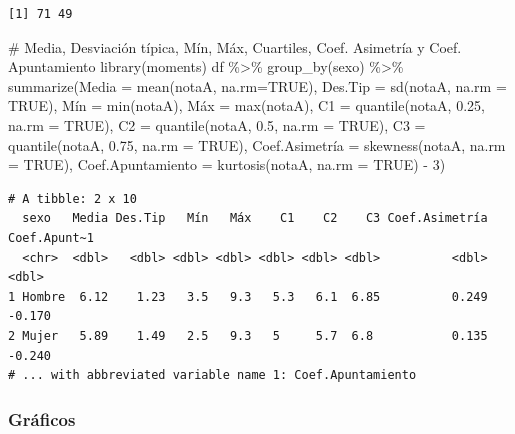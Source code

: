 \documentclass[
  a4paper,
]{scrreport}
\newenvironment{Shaded}{\begin{snugshade}}{\end{snugshade}}
\newcommand{\AttributeTok}[1]{\textcolor[rgb]{0.40,0.45,0.13}{#1}}
\newcommand{\CommentTok}[1]{\textcolor[rgb]{0.37,0.37,0.37}{#1}}
\newcommand{\ConstantTok}[1]{\textcolor[rgb]{0.56,0.35,0.01}{#1}}
\newcommand{\DecValTok}[1]{\textcolor[rgb]{0.68,0.00,0.00}{#1}}
\newcommand{\FloatTok}[1]{\textcolor[rgb]{0.68,0.00,0.00}{#1}}
\newcommand{\FunctionTok}[1]{\textcolor[rgb]{0.28,0.35,0.67}{#1}}
\newcommand{\NormalTok}[1]{\textcolor[rgb]{0.00,0.23,0.31}{#1}}
\newcommand{\OtherTok}[1]{\textcolor[rgb]{0.00,0.23,0.31}{#1}}
\newcommand{\SpecialCharTok}[1]{\textcolor[rgb]{0.37,0.37,0.37}{#1}}
\theoremstyle{definition}
\theoremstyle{definition}
\theoremstyle{remark}
\begin{document}
\begin{verbatim}
[1] 71 49
\end{verbatim}

\begin{Shaded}
\begin{Highlighting}[]
\CommentTok{\# Media, Desviación típica, Mín, Máx, Cuartiles, Coef. Asimetría y Coef. Apuntamiento}
\FunctionTok{library}\NormalTok{(moments)}
\NormalTok{df }\SpecialCharTok{\%\textgreater{}\%} \FunctionTok{group\_by}\NormalTok{(sexo) }\SpecialCharTok{\%\textgreater{}\%} \FunctionTok{summarize}\NormalTok{(}\AttributeTok{Media =} \FunctionTok{mean}\NormalTok{(notaA, }\AttributeTok{na.rm=}\ConstantTok{TRUE}\NormalTok{), }\AttributeTok{Des.Tip =} \FunctionTok{sd}\NormalTok{(notaA, }\AttributeTok{na.rm =} \ConstantTok{TRUE}\NormalTok{), Mín }\OtherTok{=} \FunctionTok{min}\NormalTok{(notaA), Máx }\OtherTok{=} \FunctionTok{max}\NormalTok{(notaA), }\AttributeTok{C1 =} \FunctionTok{quantile}\NormalTok{(notaA, }\FloatTok{0.25}\NormalTok{, }\AttributeTok{na.rm =} \ConstantTok{TRUE}\NormalTok{), }\AttributeTok{C2 =} \FunctionTok{quantile}\NormalTok{(notaA, }\FloatTok{0.5}\NormalTok{, }\AttributeTok{na.rm =} \ConstantTok{TRUE}\NormalTok{), }\AttributeTok{C3 =} \FunctionTok{quantile}\NormalTok{(notaA, }\FloatTok{0.75}\NormalTok{, }\AttributeTok{na.rm =} \ConstantTok{TRUE}\NormalTok{), Coef.Asimetría }\OtherTok{=} \FunctionTok{skewness}\NormalTok{(notaA, }\AttributeTok{na.rm =} \ConstantTok{TRUE}\NormalTok{), }\AttributeTok{Coef.Apuntamiento =} \FunctionTok{kurtosis}\NormalTok{(notaA, }\AttributeTok{na.rm =} \ConstantTok{TRUE}\NormalTok{) }\SpecialCharTok{{-}} \DecValTok{3}\NormalTok{)}
\end{Highlighting}
\end{Shaded}

\begin{verbatim}
# A tibble: 2 x 10
  sexo   Media Des.Tip   Mín   Máx    C1    C2    C3 Coef.Asimetría Coef.Apunt~1
  <chr>  <dbl>   <dbl> <dbl> <dbl> <dbl> <dbl> <dbl>          <dbl>        <dbl>
1 Hombre  6.12    1.23   3.5   9.3   5.3   6.1  6.85          0.249       -0.170
2 Mujer   5.89    1.49   2.5   9.3   5     5.7  6.8           0.135       -0.240
# ... with abbreviated variable name 1: Coef.Apuntamiento
\end{verbatim}

\hypertarget{gruxe1ficos-2}{%
\subsubsection{Gráficos}\label{gruxe1ficos-2}}
\end{document}
